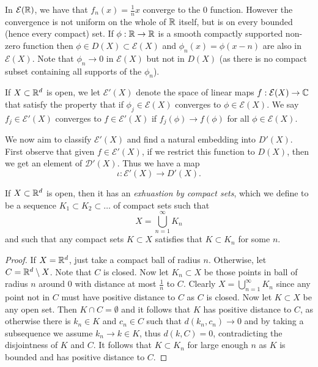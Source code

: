 \documentclass[twoside, a4paper, 10pt]{amsart}
\begin{document}
\begin{eg} In $\mathcal{E}(\mathbb{R})$, we have that $f_n(x) = \frac{1}{n}x$ converge to the $0$ function. However the convergence is not uniform on the whole of $\mathbb{R}$ itself, but is on every bounded (hence every compact) set. If $\phi:\mathbb{R} \to \mathbb{R}$ is a smooth compactly supported non-zero function then $\phi \in D(X) \subset \mathcal{E}(X)$ and $\phi_n(x) = \phi(x-n)$ are also in $\mathcal{E}(X)$. Note that $\phi_n \to 0$ in $\mathcal{E}(X)$ but not in $D(X)$ (as there is no compact subset containing all supports of the $\phi_n$). \end{eg}

\begin{mydef} If $X \subset \mathbb{R}^d$ is open, we let $\mathcal{E}'(X)$ denote the space of linear maps $f:\mathcal{E}(X) \to \mathbb{C}$ that satisfy the property that if $\phi_j \in \mathcal{E}(X)$ converges to $\phi \in \mathcal{E}(X)$. We say $f_j \in \mathcal{E}'(X)$ converges to $f \in \mathcal{E}'(X)$ if $f_j(\phi) \to f(\phi)$ for all $\phi \in \mathcal{E}(X)$.

\end{mydef}

We now aim to classify $\mathcal{E}'(X)$ and find a natural embedding into $D'(X)$. First observe that given $f \in \mathcal{E}'(X)$, if we restrict this function to $D(X)$, then we get an element of $\mathcal{D}'(X)$. Thus we have a map $$\iota:\mathcal{E}'(X) \to D'(X).$$

\begin{lemma} If $X \subset \mathbb{R}^d$ is open, then it has an \textit{exhuastion by compact sets}, which we define to be a sequence $K_1 \subset K_2 \subset \ldots$ of compact sets such that $$X = \bigcup_{n=1}^{\infty} K_n$$ and such that any compact sets $K \subset X$ satisfies that $K \subset K_n$ for some $n$.

\end{lemma}

\begin{proof} If $X = \mathbb{R}^d$, just take a compact ball of radius $n$. Otherwise, let $C = \mathbb{R}^d \setminus X$. Note that $C$ is closed. Now let $K_n \subset X$ be those points in ball of radius $n$ around $0$ with distance at most $\frac{1}{n}$ to $C$. Clearly $X = \bigcup_{n=1}^{\infty} K_n$ since any point not in $C$ must have positive distance to $C$ as $C$ is closed. Now let $K \subset X$ be any open set. Then $K \cap C = \emptyset$ and it follows that $K$ has positive distance to $C$, as otherwise there is $k_n \in K$ and $c_n \in C$ such that $d(k_n, c_n) \to 0$ and by taking a subsequence we assume $k_n \to k \in K$, thus $d(k, C) = 0$, contradicting the disjointness of $K$ and $C$. It follows that $K \subset K_n$ for large enough $n$ as $K$ is bounded and has positive distance to $C$.

\end{proof}
\end{document}
